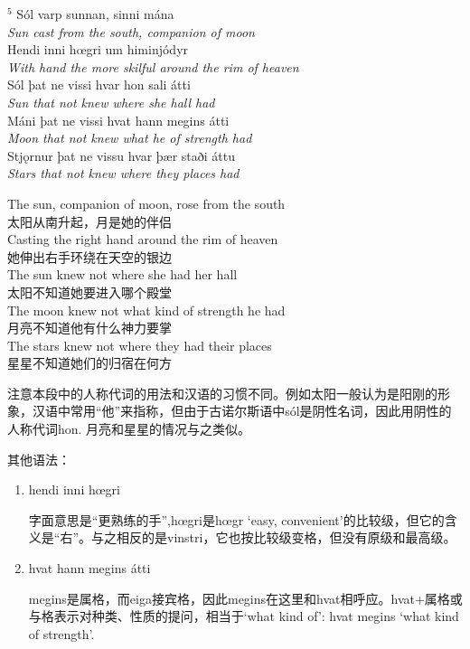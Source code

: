 \begin{paracol}{2}
    \noindent
    $^5 $ Sól varp sunnan, sinni mána\\
    \textit{Sun cast from the south, companion of moon}\\
    Hendi inni hœgri um himinjódyr\\
    \textit{With hand the more skilful around the rim of heaven}\\
    Sól þat ne vissi hvar hon sali átti\\
    \textit{Sun that not knew where she hall had}\\
    Máni þat ne vissi hvat hann megins átti\\
    \textit{Moon that not knew what he of strength had}\\
    Stjǫrnur þat ne vissu hvar þær staði áttu\\
    \textit{Stars that not knew where they places had}\\

    \switchcolumn

    \noindent
    The sun, companion of moon, rose from the south\\
    太阳从南升起，月是她的伴侣\\
    Casting the right hand around the rim of heaven  \\
    她伸出右手环绕在天空的银边\\
    The sun knew not where she had her hall\\
    太阳不知道她要进入哪个殿堂\\
    The moon knew not what kind of strength he had\\
    月亮不知道他有什么神力要掌\\
    The stars knew not where they had their places\\
    星星不知道她们的归宿在何方\\

\end{paracol}
\begin{grammar*}{}
    注意本段中的人称代词的用法和汉语的习惯不同。例如太阳一般认为是阳刚的形象，汉语中常用“他”来指称，但由于古诺尔斯语中sól是阴性名词，因此用阴性的人称代词hon. 月亮和星星的情况与之类似。

    其他语法：
    \begin{enumerate}
        \item hendi inni hœgri

              字面意思是“更熟练的手”,hœgri是hœgr `easy, convenient'的比较级，但它的含义是“右”。与之相反的是vinstri，它也按比较级变格，但没有原级和最高级。

        \item hvat hann megins átti

              megins是属格，而eiga接宾格，因此megins在这里和hvat相呼应。hvat+属格或与格表示对种类、性质的提问，相当于`what kind of': hvat megins `what kind of strength'.
    \end{enumerate}
\end{grammar*}
\hspace*{\fill}\\ %

